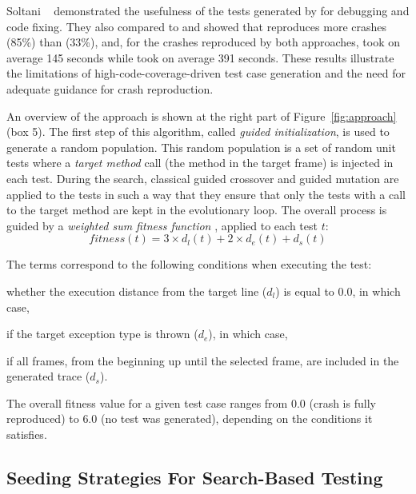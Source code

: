 Soltani \etal~\cite{soltani2017} demonstrated the usefulness of the tests generated by \evocrash for debugging and code fixing. They also compared \evocrash to \evosuite and showed that \evocrash reproduces more crashes (85\%) than \evosuite (33\%), and, for the crashes reproduced by both approaches, \evocrash took on average 145 seconds while \evosuite took on average 391 seconds. These results illustrate the limitations of high-code-coverage-driven test case generation and the need for adequate guidance for crash reproduction. 

An overview of the \evocrash approach is shown at the right part of Figure~\ref{fig:approach} (box 5). The first step of this algorithm, called \emph{guided initialization}, is used to generate a random population. This random population is a set of random unit tests where a \emph{target method}  call (\ie the method in the target frame) is injected in each test. During the search, classical guided crossover and guided mutation are applied to the tests in such a way that they ensure that only the tests with a call to the target method are kept in the evolutionary loop.
%
The overall process is guided by a \emph{weighted sum fitness function} \cite{Soltani2018b}, applied to each  test $t$:
\begin{equation} \label{fitness_function}
%
fitness(t) = 3 \times d_{l}(t) + 2 \times d_{e}(t) + d_{s}(t)
%
\end{equation}

The terms correspond to the following conditions when executing the test:
\begin{inparaenum}[(i)]
\item whether the execution distance from the target line ($d_{l}$) is equal to $0.0$, in which case,
\item if the target exception type is thrown ($d_{e}$), in which case,
\item if all frames, from the beginning up until the selected frame, are included in the generated trace ($d_{s}$).
\end{inparaenum}
The overall fitness value for a given test case ranges from $0.0$ (crash is fully reproduced) to $6.0$ (no test was generated), depending on the conditions it satisfies.


\subsection{Seeding Strategies For Search-Based Testing}

